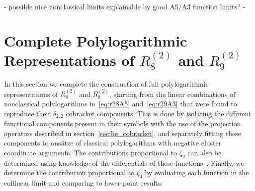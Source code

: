 \documentclass[11pt]{article}
\DeclareMathOperator{\Gr}{Gr}
\def\pdfeq#1{\texorpdfstring{$#1$}{a}}
\begin{document}
\vspace{2cm}

- possible nice nonclassical limits explainable by good A5/A3 function limits?
- 




\section{Complete Polylogarithmic Representations of \pdfeq{R_8^{(2)}} and \pdfeq{R_9^{(2)}}}
\label{sec:r28_and_r29}

In this section we complete the construction of full polylogarithmic representations of $R_8^{(2)}$\! and $R_9^{(2)}$\!, starting from the linear combinations of nonclassical polylogarithms in~\eqref{eq:r28A5} and~\eqref{eq:r29A3} that were found to reproduce their $\delta_{2,2}$ cobracket components. This is done by isolating the different functional components present in their symbols with the use of the projection operators described in section~\ref{sec:lie_cobracket}, and separately fitting these components to ans\"atze of classical polylogarithms with negative cluster coordinate arguments. The contributions proportional to $\zeta_2$ can also be determined using knowledge of the differentials of these functions~\cite{Golden:2013lha}. Finally, we determine the contribution proportional to $\zeta_4$ by evaluating each function in the collinear limit and comparing to lower-point results.


\end{document}
